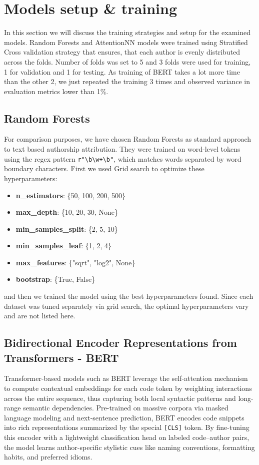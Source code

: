 \documentclass[conference]{IEEEtran}
\begin{document}
\section{Models setup \& training}

In this section we will discuss the training strategies and setup for the examined models.
Random Forests and AttentionNN models were trained using Stratified Cross validation strategy that ensures, that each author is evenly distributed
across the folds. Number of folds was set to 5 and 3 folds were used for training, 1 for validation and 1 for testing.
As training of BERT takes a lot more time than the other 2, we just repeated the training 3 times and 
observed variance in evaluation metrics lower than 1\%.

\subsection{Random Forests}

For comparison purposes, we have chosen Random Forests as standard approach to text based authorship attribution. 
They were trained on word-level tokens using the regex pattern \verb|r"\b\w+\b"|, which matches words separated by word boundary characters.
First we used Grid search to optimize these hyperparameters:
\begin{itemize}
    \item \textbf{n\_estimators}: \{50, 100, 200, 500\}
    \item \textbf{max\_depth}: \{10, 20, 30, None\}
    \item \textbf{min\_samples\_split}: \{2, 5, 10\}
    \item \textbf{min\_samples\_leaf}: \{1, 2, 4\}
    \item \textbf{max\_features}: \{"sqrt", "log2", None\}
    \item \textbf{bootstrap}: \{True, False\}
\end{itemize}

and then we trained the model using the best hyperparameters found. Since each 
dataset was tuned separately via grid search, the optimal hyperparameters vary 
and are not listed here.

\subsection{Bidirectional Encoder Representations from Transformers - BERT}

Transformer-based models such as BERT leverage the self-attention 
mechanism to compute contextual embeddings for each code token by weighting 
interactions across the entire sequence, thus capturing both local syntactic 
patterns and long-range semantic dependencies. Pre-trained on massive corpora 
via masked language modeling and next-sentence prediction, BERT encodes code 
snippets into rich representations summarized by the special \texttt{[CLS]} token. 
By fine-tuning this encoder with a lightweight classification head on labeled 
code–author pairs, the model learns author-specific stylistic cues like naming conventions, formatting habits, 
and preferred idioms.
\end{document}
